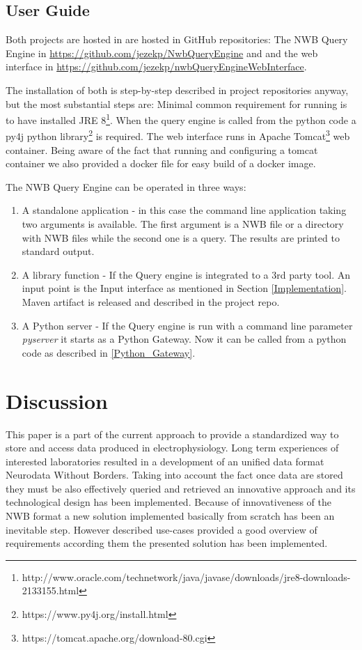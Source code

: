 \documentclass[utf8]{frontiersSCNS} %
\begin{document}
\subsection{User Guide}

Both projects are hosted in are hosted in GitHub repositories: The NWB Query Engine in \url{https://github.com/jezekp/NwbQueryEngine} and and the web interface in \url{https://github.com/jezekp/nwbQueryEngineWebInterface}. 

The installation of both is step-by-step described in project repositories anyway, but the most substantial steps are:  Minimal common requirement for running is to have installed JRE 8\footnote{http://www.oracle.com/technetwork/java/javase/downloads/jre8-downloads-2133155.html}. When the query engine is called from the python code a py4j python library\footnote{https://www.py4j.org/install.html} is required. The web interface runs in Apache Tomcat\footnote{https://tomcat.apache.org/download-80.cgi} web container. Being aware of the fact that running and configuring a tomcat container we also provided a docker file for easy build of a docker image.

The NWB Query Engine can be operated in three ways:
\begin{enumerate}
 \item A standalone application - in this case the command line application taking two arguments is available. The first argument is a NWB file or a directory with NWB files while the second one is a query. The results are printed to standard output.
 \item A library function - If the Query engine is integrated to a 3rd party tool. An input point is the Input interface as mentioned in Section \ref{Implementation}. Maven artifact is released and described in the project repo.
 \item A Python server - If the Query engine is run with a command line parameter \emph{pyserver} it starts as a Python Gateway. Now it can be called from a python code as described in \ref{Python_Gateway}.
\end{enumerate}


\section{Discussion}
\label{Discussion}

This paper is a part of the current approach to provide a standardized way to store and access data produced in electrophysiology. Long term experiences of interested laboratories resulted in a development of an unified data format Neurodata Without Borders. Taking into account the fact once data are stored they must be also effectively queried and retrieved an innovative approach and its technological design has been implemented. Because of innovativeness of the NWB format a new solution implemented basically from scratch has been an inevitable step. However described use-cases provided a good overview of requirements according them the presented solution has been implemented.
\end{document}
